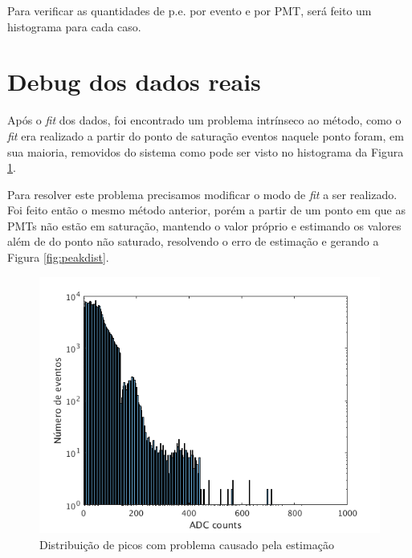 Para verificar as quantidades de p.e. por evento e por PMT, será feito um histograma para cada caso. 

\section{Debug dos dados reais}


Após o \emph{fit} dos dados, foi encontrado um problema intrínseco ao método, como o \emph{fit} era realizado a partir do ponto de saturação eventos naquele ponto foram, em sua maioria, removidos do sistema como pode ser visto no histograma da Figura \ref{fig:peakdist_errado}.

Para resolver este problema precisamos modificar o modo de \emph{fit} a ser realizado. Foi feito então o mesmo método anterior, porém a partir de um ponto em que as PMTs não estão em saturação, mantendo o valor próprio e estimando os valores além de do ponto não saturado, resolvendo o erro de estimação e gerando a Figura \ref{fig:peakdist}.

\begin{figure}[H]
	\centering
	\includegraphics[width=14cm]{textuais/dadosreais/figuras/peakdist_errado.png}
	\caption{Distribuição de picos com problema causado pela estimação}
	\label{fig:peakdist_errado}
\end{figure}

